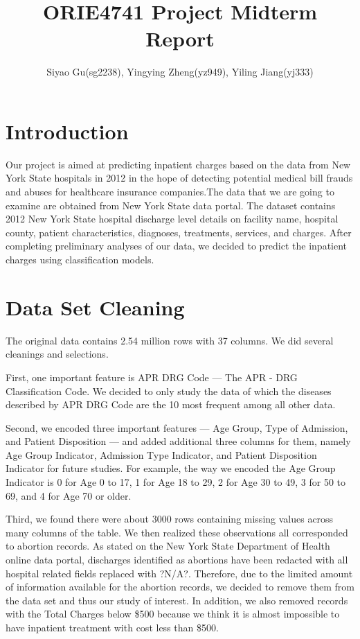 \documentclass[journal, a4paper,11pt]{IEEEtran}
\begin{document}
	\title{ORIE4741 Project Midterm Report}
	\author{Siyao Gu(sg2238), Yingying Zheng(yz949), Yiling Jiang(yj333)}
	\maketitle
\section{Introduction}
	Our project is aimed at predicting inpatient charges based on the data from New York State hospitals in 2012 in the hope of detecting potential medical bill frauds and abuses for healthcare insurance companies.The data that we are going to examine are obtained from New York State data portal. The dataset contains 2012 New York State hospital discharge level details on facility name, hospital county, patient characteristics, diagnoses, treatments, services, and charges. After completing preliminary analyses of our data, we decided to predict the inpatient charges using classification models.

\section{Data Set Cleaning}
	The original data contains 2.54 million rows with 37 columns. We did several cleanings and selections.

	First, one important feature is APR DRG Code --- The APR - DRG Classification Code. We decided to only study the data of which the diseases described by APR DRG Code are the 10 most frequent among all other data.

	Second, we encoded three important features --- Age Group, Type of Admission, and Patient Disposition --- and added additional three columns for them, namely Age Group Indicator, Admission Type Indicator, and Patient Disposition Indicator for future studies. For example, the way we encoded the Age Group Indicator is 0 for Age 0 to 17, 1 for Age 18 to 29, 2 for Age 30 to 49, 3 for 50 to 69, and 4 for Age 70 or older.
    
	Third, we found there were about 3000 rows containing missing values across many columns of the table. We then realized these observations all corresponded to abortion records. As stated on the New York State Department of Health online data portal, discharges identified as abortions have been redacted with all hospital related fields replaced with ?N/A?. Therefore, due to the limited amount of information available for the abortion records, we decided to remove them from the data set and thus our study of interest. In addition, we also removed records with the Total Charges below \$500 because we think it is almost impossible to have inpatient treatment with cost less than \$500.
\end{document}
